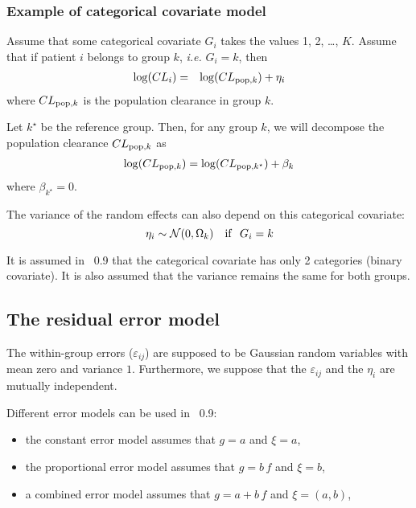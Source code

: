 \subsubsection{Example of categorical covariate model} \label{section_model_catcov}
Assume that some categorical covariate  $G_i$ takes the values 1, 2, \ldots, $K$.
Assume that if patient $i$ belongs to group $k$, {\it i.e.} $G_i=k$, then
\begin{eqnarray*}
\log(CL_i) &=&  \log(CL_{{\rm pop},k}) + \eta_i
\end{eqnarray*}
where $CL_{{\rm pop},k}$ is the population clearance in group $k$.

Let $k^\star$ be the reference group. Then, for any group $k$, we will decompose the population clearance $CL_{{\rm pop},k}$ as
\begin{eqnarray*}
\log(CL_{{\rm pop},k}) = \log(CL_{{\rm pop},k^\star}) + \beta_k
\end{eqnarray*}
where $\beta_{k^\star} = 0$.

The variance of the random effects can also depend on this categorical covariate:
$$ {\eta_i} \sim \mathcal{N}(0, {\Omega}_k) \ \ \ {\rm if } \ \ G_i=k $$

 It is assumed in \monolix~0.9 that the categorical covariate has only 2 categories (binary covariate). It is also assumed that the variance remains the same for both groups.

\subsection{The residual error model} \label{section_model_residual}
The within-group errors ($\varepsilon_{ij}$)  are  supposed  to be  Gaussian random variables  with mean  zero and variance $1$.
Furthermore, we suppose that the $\varepsilon_{ij}$ and the $\eta_{i}$ are mutually independent.

Different error models can be used in \monolix~0.9:
\begin{itemize}
\item the constant error model assumes that $g=a$ and $\xi=a$,
\item the proportional error model assumes that $g=b\,f$ and $\xi=b$,
\item a combined error model assumes that $g=a+b\,f$ and $\xi=(a,b)$,
\end{itemize}

